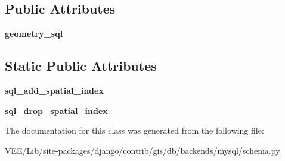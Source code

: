 \subsection*{Public Attributes}
\begin{DoxyCompactItemize}
\item 
\mbox{\label{classdjango_1_1contrib_1_1gis_1_1db_1_1backends_1_1mysql_1_1schema_1_1_my_s_q_l_g_i_s_schema_editor_a33ea65de2579eb48ad5df4e855d2743e}} 
{\bfseries geometry\+\_\+sql}
\end{DoxyCompactItemize}
\subsection*{Static Public Attributes}
\begin{DoxyCompactItemize}
\item 
\mbox{\label{classdjango_1_1contrib_1_1gis_1_1db_1_1backends_1_1mysql_1_1schema_1_1_my_s_q_l_g_i_s_schema_editor_a3117091bd6e0c939b4634397f959bc28}} 
{\bfseries sql\+\_\+add\+\_\+spatial\+\_\+index}
\item 
\mbox{\label{classdjango_1_1contrib_1_1gis_1_1db_1_1backends_1_1mysql_1_1schema_1_1_my_s_q_l_g_i_s_schema_editor_aba16ffb3ac71cb93bcf828bf9a6706b0}} 
{\bfseries sql\+\_\+drop\+\_\+spatial\+\_\+index}
\end{DoxyCompactItemize}


The documentation for this class was generated from the following file\+:\begin{DoxyCompactItemize}
\item 
V\+E\+E/\+Lib/site-\/packages/django/contrib/gis/db/backends/mysql/schema.\+py\end{DoxyCompactItemize}
